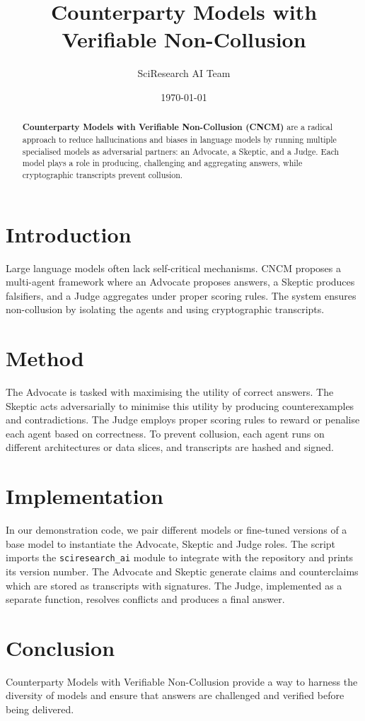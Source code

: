 \documentclass{article}
\title{Counterparty Models with Verifiable Non-Collusion}
\author{SciResearch AI Team}
\date{\today}
\begin{document}
\maketitle
\begin{abstract}
\textbf{Counterparty Models with Verifiable Non-Collusion (CNCM)} are a radical
approach to reduce hallucinations and biases in language models by running
multiple specialised models as adversarial partners: an Advocate, a Skeptic,
and a Judge. Each model plays a role in producing, challenging and aggregating
answers, while cryptographic transcripts prevent collusion.
\end{abstract}
\section{Introduction}
Large language models often lack self-critical mechanisms. CNCM proposes a
multi-agent framework where an Advocate proposes answers, a Skeptic produces
falsifiers, and a Judge aggregates under proper scoring rules. The system
ensures non-collusion by isolating the agents and using cryptographic
transcripts.
\section{Method}
The Advocate is tasked with maximising the utility of correct answers. The
Skeptic acts adversarially to minimise this utility by producing
counterexamples and contradictions. The Judge employs proper scoring rules to
reward or penalise each agent based on correctness. To prevent collusion,
each agent runs on different architectures or data slices, and transcripts
are hashed and signed.
\section{Implementation}
In our demonstration code, we pair different models or fine-tuned versions of
a base model to instantiate the Advocate, Skeptic and Judge roles. The script
imports the \texttt{sciresearch\_ai} module to integrate with the repository
and prints its version number. The Advocate and Skeptic generate claims and
counterclaims which are stored as transcripts with signatures. The Judge,
implemented as a separate function, resolves conflicts and produces a final
answer.
\section{Conclusion}
Counterparty Models with Verifiable Non-Collusion provide a way to harness
the diversity of models and ensure that answers are challenged and verified
before being delivered.
\end{document}
